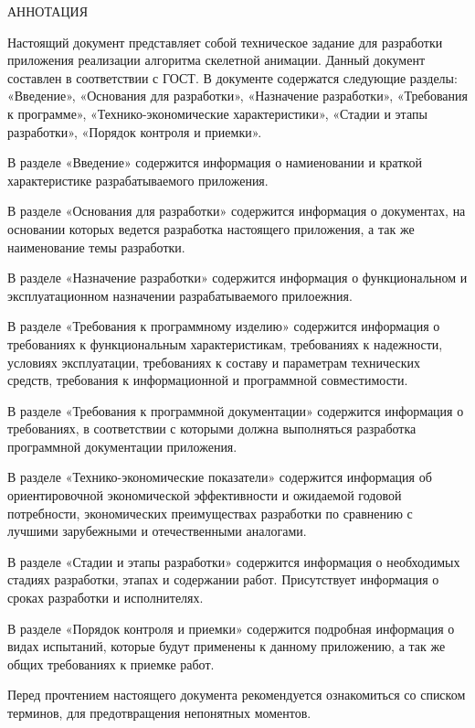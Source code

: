 \newpage

\begin{center}
{\large АННОТАЦИЯ}
\end{center}

Настоящий документ представляет собой техническое задание для разработки приложения реализации алгоритма скелетной анимации. Данный документ составлен в соответствии с ГОСТ. В документе содержатся следующие разделы: «Введение», «Основания для разработки», «Назначение разработки», «Требования к программе», «Технико-экономические характеристики», «Стадии и этапы разработки», «Порядок контроля и приемки».

В разделе «Введение» содержится информация о намиеновании и краткой характеристике разрабатываемого приложения.

В разделе «Основания для разработки» содержится информация о документах, на основании которых ведется разработка настоящего приложения, а так же наименование темы разработки.

В разделе «Назначение разработки» содержится информация о функциональном и эксплуатационном назначении разрабатываемого прилоежния.

В разделе «Требования к программному изделию» содержится информация о требованиях к функциональным характеристикам, требованиях к надежности, условиях эксплуатации, требованиях к составу и параметрам технических средств, требования к информационной и программной совместимости.

В разделе «Требования к программной документации» содержится информация о требованиях, в соответствии с которыми должна выполняться разработка программной документации приложения.

В разделе «Технико-экономические показатели» содержится информация об ориентировочной экономической эффективности и ожидаемой годовой потребности, экономических преимуществах разработки по сравнению с лучшими зарубежными и отечественными аналогами.

В разделе «Стадии и этапы разработки» содержится информация о необходимых стадиях разработки, этапах и содержании работ. Присутствует информация о сроках разработки и исполнителях.

В разделе «Порядок контроля и приемки» содержится подробная информация о видах испытаний, которые будут применены к данному приложению, а так же общих требованиях к приемке работ.

Перед прочтением настоящего документа рекомендуется ознакомиться со списком терминов, для предотвращения непонятных моментов.

